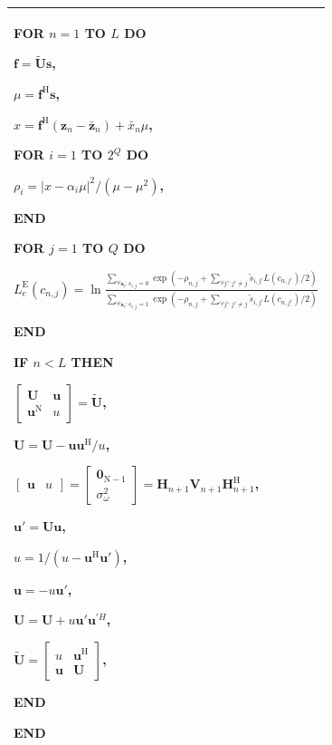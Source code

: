 \begin{longtable}{l}
\begin{minipage}[tb]{15cm}
     \quad FOR $n=1$ TO $L$ DO

     \qquad $\mathbf{f}=\tilde{\mathbf{U}}\mathbf{s}$,
     
     \qquad $\mu=\mathbf{f}^{\mathrm{H}}\mathbf{s}$,

     \qquad  $x=\mathbf{f}^{\mathrm{H}}(\mathbf{z}_n-\bar{\mathbf{z}}_n)+\bar{x}_n\mu$,

     \quad FOR $i=1$ TO $2^Q$ DO

     \qquad $\rho_i=|x-\alpha_i\mu|^2/(\mu-\mu^2)$,

     \quad END

     \quad FOR $j=1$ TO $Q$ DO

     \qquad $ L_e^{\mathrm{E}}(c_{n,j})=\ln\frac{\displaystyle\sum_{\forall
         \mathbf{s}_i:s_{i,j}=0}\exp\left(-\rho_{n,j}+\sum_{\forall
         {j}':{j}'\neq j}\tilde{s}_{i,{j}'}L(c_{n,{j}'})/2\right
         )}{\displaystyle\sum_{\forall
         \mathbf{s}_i:s_{i,j}=1}\exp\left(-\rho_{n,j}+\sum_{\forall
         {j}':{j}'\neq j}\tilde{s}_{i,{j}'}L(c_{n,{j}'})/2\right)}$
         
         \quad END

     \quad IF $n<L$ THEN

     \qquad
     $\begin{bmatrix}\mathbf{U}&\mathbf{u}\\\mathbf{u}^{\mathrm{N}}&u\end{bmatrix}=\tilde{\mathbf{U}}$,

     \qquad    $\mathbf{U}=\mathbf{U}-\mathbf{u}\mathbf{u}^{\mathrm{H}}/u$,

     \qquad
     $\begin{bmatrix}\mathbf{u}&u\end{bmatrix}=\begin{bmatrix}\mathbf{0}_{\mathrm{N}-1}\\\sigma_{\omega}^2\end{bmatrix}=\mathbf{H}_{n+1}\mathbf{V}_{n+1}\mathbf{H}_{n+1}^{\mathrm{H}}$,

        \qquad ${\mathbf{u}}'=\mathbf{U}\mathbf{u}$,

       \qquad  $u=1/(u-\mathbf{u}^{\mathrm{H}}{\mathbf{u}}')$,

       \qquad  $\mathbf{u}=-u{\mathbf{u}}'$,

       \qquad  $\mathbf{U}=\mathbf{U}+u{\mathbf{u}}'{\mathbf{u}}^{'H}$,

       \qquad  $\tilde{\mathbf{U}}=\begin{bmatrix}u &
             \mathbf{u}^{\mathrm{H}}\\\mathbf{u}& \mathbf{U}\end{bmatrix}$,

        \quad     END

         \quad    END
     \vspace{5mm}
 \end{minipage}\\
    \hline
\end{longtable}
